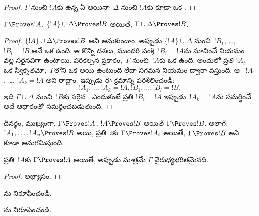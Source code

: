 \documentclass[../../../include/open-logic-section]{subfiles}
\begin{document}
\begin{proof}
$\Gamma$ నుంచి $!A$కు ఉన్న ఏ  అయినా~$\Delta$ నుంచి
$!A$కు కూడా ఒక .
\end{proof}

\begin{prop}[సంక్రామకత్వం]
$\Gamma \Proves !A$, $\{!A\} \cup \Delta \Proves !B$ అయితే,
$\Gamma \cup \Delta \Proves !B$.
\end{prop}

\begin{proof}
  $\{!A\} \cup \Delta \Proves !B$ అని అనుకుందాం. అప్పుడు
  $\{!A\} \cup \Delta$ నుంచి~$!B_1$, \dots, $!B_l = !B$ అనే ఒక
   ఉంది. ఆ  కొన్ని దశలు, ముందరి
  పంక్తి~$!B_i = !A$ను సూచించే నియమం వల్ల సరైనవిగా ఉంటాయి.
  పరికల్పన ప్రకారం,~$\Gamma$ నుంచి~$!A$కు ఒక  ఉంది.
  అందులో ప్రతి $!A_i$ ఒక స్వీకృతమో,~$\Gamma$లోని ఒక
   అయి ఉంటుంది లేదా నిగమన నియమం ద్వారా వస్తుంది.
  ఆ ~$!A_1$, \dots, $!A_k = !A$ అని రాద్దాం. ఇప్పుడు ఈ క్రమాన్ని
  పరిశీలించండి:
  \[
  !A_1, \dots, !A_k = !A, !B_1, \dots, !B_l = !B.
  \]
  ఇది $\Gamma \cup \Delta$ నుంచి~$!B$కు సరైన . ఎందుకంటే
  ప్రతి $!B_i = !A$ ఇప్పుడు~$!A_k = !A$ను సమర్థించే అదే ఆధారంతో
  సమర్థించబడుతుంది.
\end{proof}

దీనర్థం, ముఖ్యంగా, $\Gamma \Proves !A$, $!A \Proves !B$ అయితే
$\Gamma \Proves !B$. అలాగే, $!A_1, \dots, !A_n \Proves !B$ అయి,
ప్రతి~$i$కు $\Gamma \Proves !A_i$ అయితే, $\Gamma \Proves !B$ అని
కూడా అనుగమిస్తుంది.

\begin{prop}
ప్రతి~$!A$కు $\Gamma \Proves !A$ అయితే, అప్పుడు మాత్రమే $\Gamma$
వైరుధ్యభరితమైనది.
\end{prop}

\begin{proof}
అభ్యాసం.
\end{proof}

\begin{prob}
ను నిరూపించండి.
\end{prob}
\tagendprob

\begin{prob}
ను నిరూపించండి.
\end{prob}
\tagendprob
\end{document}
